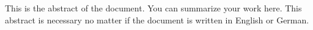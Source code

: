This is the abstract of the document. You can summarize your work here.
This abstract is necessary no matter if the document is written in English or German.


